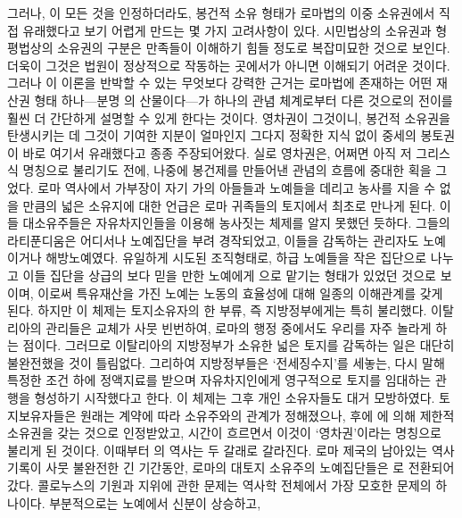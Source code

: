 그러나,
이 모든 것을 인정하더라도,
봉건적 소유 형태가 로마법의 이중 소유권에서 직접
유래했다고 보기 어렵게 만드는 몇 가지 고려사항이 있다.
시민법상의 소유권과 형평법상의 소유권의 구분은
만족들이 이해하기 힘들 정도로 복잡미묘한 것으로 보인다.
더욱이 그것은 법원이 정상적으로 작동하는 곳에서가 아니면 이해되기 어려운 것이다.
그러나 이 이론을 반박할 수 있는 무엇보다 강력한 근거는
로마법에 존재하는 어떤 재산권 형태 하나---분명 의 산물이다---가
하나의 관념 체계로부터 다른 것으로의 전이를 훨씬 더
간단하게 설명할 수 있게 한다는 것이다.
영차권이 그것이니,
봉건적 소유권을 탄생시키는 데
그것이 기여한 지분이 얼마인지 그다지 정확한 지식 없이
중세의 봉토권이 바로 여기서 유래했다고
종종
주장되어왔다.
실로
영차권은,
어쩌면 아직 저 그리스식 명칭으로 불리기도 전에,
나중에 봉건제를 만들어낸 관념의 흐름에 중대한 획을 그었다.
로마 역사에서
가부장이 자기 가의 아들들과 노예들을 데리고
농사를 지을 수 없을 만큼의 넓은 소유지에 대한 언급은
로마 귀족들의 토지에서 최초로 만나게 된다.
이들 대소유주들은
자유차지인들을 이용해 농사짓는 체제를 알지 못했던 듯하다.
그들의 라티푼디움은 어디서나
노예집단을 부려 경작되었고,
이들을 감독하는 관리자도 노예이거나 해방노예였다.
유일하게 시도된 조직형태로,
하급 노예들을 작은 집단으로 나누고
이들 집단을 상급의 보다 믿을 만한 노예에게
으로 맡기는
형태가 있었던 것으로 보이며,
이로써 특유재산을 가진 노예는 노동의 효율성에 대해
일종의 이해관계를 갖게 된다.
하지만 이 체제는 토지소유자의 한 부류, 즉
지방정부에게는
특히 불리했다.
이탈리아의 관리들은 교체가 사뭇 빈번하여,
로마의 행정 중에서도 우리를 자주 놀라게 하는 점이다.
그러므로 이탈리아의 지방정부가 소유한 넓은 토지를
감독하는 일은 대단히 불완전했을 것이 틀림없다.
그리하여 지방정부들은
`전세징수지'를 세놓는,
다시 말해 특정한 조건 하에
정액지료를 받으며
자유차지인에게
영구적으로
토지를
임대하는
관행을 형성하기 시작했다고 한다.
이 체제는 그후 개인 소유자들도 대거 모방하였다.
토지보유자들은
원래는 계약에 따라
소유주와의 관계가
정해졌으나, 후에
에 의해 제한적 소유권을 갖는 것으로 인정받았고,
시간이 흐르면서 이것이 `영차권'이라는 명칭으로 불리게 된 것이다.
이때부터
의 역사는 두 갈래로 갈라진다.
로마 제국의 남아있는 역사기록이 사뭇 불완전한 긴 기간동안,
로마의 대토지 소유주의 노예집단들은
로 전환되어갔다.
콜로누스의 기원과 지위에 관한 문제는
역사학 전체에서 가장 모호한 문제의 하나이다.
부분적으로는 노예에서 신분이 상승하고,
